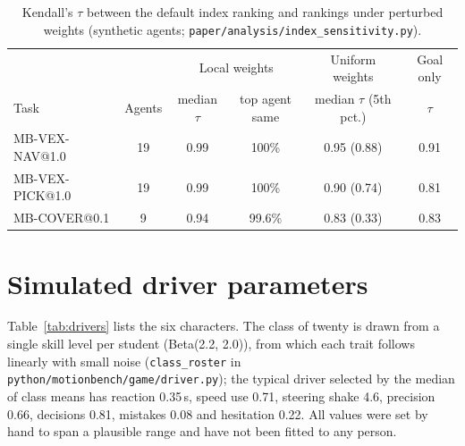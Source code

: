 \documentclass[11pt]{article}
\begin{document}
\begin{table}[h]
\centering\small
\begin{tabular}{@{}lccccc@{}}
\toprule
& & \multicolumn{2}{c}{Local weights} & Uniform weights & Goal only \\
\cmidrule(lr){3-4}\cmidrule(lr){5-5}\cmidrule(lr){6-6}
Task & Agents & median $\tau$ & top agent same & median $\tau$ (5th pct.) & $\tau$ \\
\midrule
MB-VEX-NAV@1.0 & 19 & 0.99 & 100\% & 0.95 (0.88) & 0.91 \\
MB-VEX-PICK@1.0 & 19 & 0.99 & 100\% & 0.90 (0.74) & 0.81 \\
MB-COVER@0.1 & 9 & 0.94 & 99.6\% & 0.83 (0.33) & 0.83 \\
\bottomrule
\end{tabular}
\caption{Kendall's $\tau$ between the default index ranking and rankings under perturbed weights
(synthetic agents; \texttt{paper/analysis/index\_sensitivity.py}).}
\label{tab:sens}
\end{table}

\section{Simulated driver parameters}\label{app:drivers}

Table~\ref{tab:drivers} lists the six characters. The class of twenty is drawn from a single skill
level per student (Beta(2.2, 2.0)), from which each trait follows linearly with small noise
(\texttt{class\_roster} in \texttt{python/motionbench/game/driver.py}); the typical driver selected by
the median of class means has reaction 0.35\,s, speed use 0.71, steering shake 4.6\textdegree, precision
0.66, decisions 0.81, mistakes 0.08 and hesitation 0.22. All values were set by hand to span a plausible
range and have not been fitted to any person.

\begin{table}[h]
\centering\small
{}
\caption{Simulated driver characters. Decisions: probability of choosing the sensible next object;
mistakes: probability per delivery of a fumble; hesitation: probability per decision of pausing.}
\label{tab:drivers}
\end{table}
\end{document}
